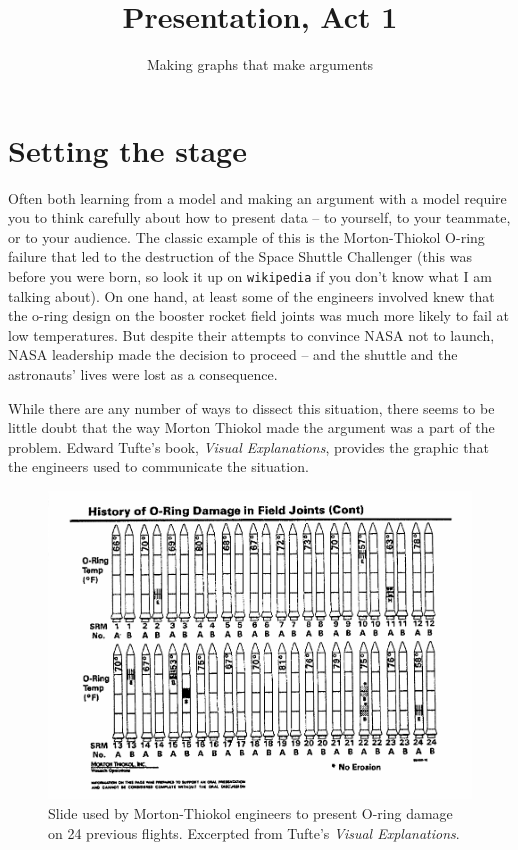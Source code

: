 \documentclass{tufte-handout}
\title{Presentation, Act 1}
\author{Making graphs that make arguments}
\begin{document}
\maketitle

\section{Setting the stage}
Often both learning from a model and making an argument with a model require you to think carefully about how to present data -- to yourself, to your teammate, or to your audience.  The classic example of this is the Morton-Thiokol O-ring failure that led to the destruction of the Space Shuttle Challenger (this was before you were born, so look it up on {\tt wikipedia} if you don't know what I am talking about).  On one hand, at least some of the engineers involved knew that the o-ring design on the booster rocket field joints was much more likely to fail at low temperatures.     But despite their attempts to convince NASA not to launch, NASA leadership made the decision to proceed -- and the shuttle and the astronauts' lives were lost as a consequence.  

While there are any number of ways to dissect this situation, there seems to be little doubt that the way Morton Thiokol made the argument  was a part of the problem.  Edward Tufte's book, {\it Visual Explanations}, provides the graphic that the engineers used to communicate the situation.


\begin{figure}[h!]
\includegraphics[width=4.5in]{figs/Thiokol1}
\caption{Slide used by Morton-Thiokol engineers to present O-ring damage on 24 previous flights.  Excerpted from Tufte's {\it Visual Explanations}.}
\end{figure}
\end{document}
